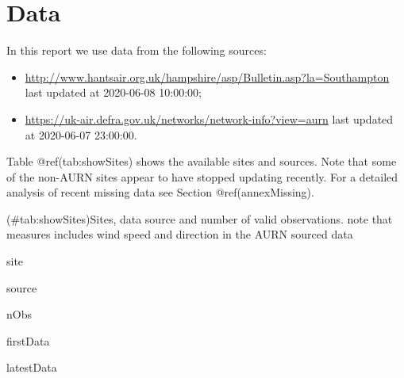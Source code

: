 \documentclass[]{article}
\newenvironment{Shaded}{\begin{snugshade}}{\end{snugshade}}
\newcommand{\KeywordTok}[1]{\textcolor[rgb]{0.13,0.29,0.53}{\textbf{#1}}}
\newcommand{\DataTypeTok}[1]{\textcolor[rgb]{0.13,0.29,0.53}{#1}}
\newcommand{\DecValTok}[1]{\textcolor[rgb]{0.00,0.00,0.81}{#1}}
\newcommand{\StringTok}[1]{\textcolor[rgb]{0.31,0.60,0.02}{#1}}
\newcommand{\OperatorTok}[1]{\textcolor[rgb]{0.81,0.36,0.00}{\textbf{#1}}}
\newcommand{\NormalTok}[1]{#1}
\providecommand{\tightlist}{%
  \setlength{\itemsep}{0pt}\setlength{\parskip}{0pt}}
\begin{document}
\section{Data}\label{data}

In this report we use data from the following sources:

\begin{itemize}
\tightlist
\item
  \url{http://www.hantsair.org.uk/hampshire/asp/Bulletin.asp?la=Southampton}
  last updated at 2020-06-08 10:00:00;
\item
  \url{https://uk-air.defra.gov.uk/networks/network-info?view=aurn} last
  updated at 2020-06-07 23:00:00.
\end{itemize}

Table @ref(tab:showSites) shows the available sites and sources. Note
that some of the non-AURN sites appear to have stopped updating
recently. For a detailed analysis of recent missing data see Section
@ref(annexMissing).

\begin{Shaded}
\end{Shaded}

(\#tab:showSites)Sites, data source and number of valid observations.
note that measures includes wind speed and direction in the AURN sourced
data

site

source

nObs

firstData

latestData
\end{document}
